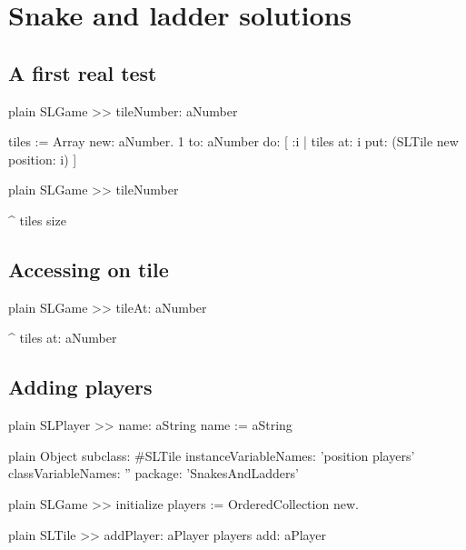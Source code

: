 \documentclass[10pt,twoside,english]{_support/latex/sbabook/sbabook}
\begin{document}
\frontmatter
\pagestyle{plain}

\tableofcontents*
\clearpage\listoffigures

\mainmatter

\chapter{Snake and ladder solutions}\section{A first real test}
\begin{displaycode}{plain}
SLGame >> tileNumber: aNumber

	tiles := Array new: aNumber.
	1 to: aNumber do: [ :i |
		tiles at: i put: (SLTile new position: i) ]
\end{displaycode}

\begin{displaycode}{plain}
SLGame >> tileNumber
	
	^ tiles size
\end{displaycode}
\section{Accessing on tile}
\begin{displaycode}{plain}
SLGame >> tileAt: aNumber

	^ tiles at: aNumber
\end{displaycode}
\section{Adding players}
\begin{displaycode}{plain}
SLPlayer >> name: aString 
	name := aString
\end{displaycode}

\begin{displaycode}{plain}
Object subclass: #SLTile
	instanceVariableNames: 'position players'
	classVariableNames: ''
	package: 'SnakesAndLadders'
\end{displaycode}

\begin{displaycode}{plain}
SLGame >> initialize
	players := OrderedCollection new. 
\end{displaycode}

\begin{displaycode}{plain}
SLTile >> addPlayer: aPlayer	
	players add: aPlayer
\end{displaycode}
\end{document}
